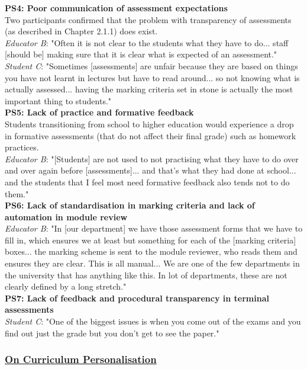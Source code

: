 \textbf{PS4: Poor communication of assessment expectations}\\
Two participants confirmed that the problem with transparency of assessments (as described in Chapter 2.1.1) 
does exist.\\
\textit{Educator B}: "Often it is not clear to the students what they have to do... staff [should be] making sure 
that it is clear what is expected of an assessment."\\
\textit{Student C}: "Sometimes [assessments] are unfair because they are based on things you have 
not learnt in lectures but have to read around... so not knowing what is actually assessed... having the 
marking criteria set in stone is actually the most important thing to students."
\vspace{0.25cm}\\
\textbf{PS5: Lack of practice and formative feedback}\\
Students transitioning from school to higher education would experience a drop in formative assessments
(that do not affect their final grade) such as homework practices.\\
\textit{Educator B}: "[Students] are not used to not practising what they have to do over and over again before
[assessments]... and that's what they had done at school... and the students that I feel most need 
formative feedback also tends not to do them."
\vspace{0.25cm}\\
\textbf{PS6: Lack of standardisation in marking criteria and lack of automation in module review}\\
\textit{Educator B}: "In [our department] we have those assessment forms that we have to fill in, which ensures 
we at least but something for each of the [marking criteria] boxes... the marking scheme is sent to the module 
reviewer, who reads them and ensures they are clear. This is all manual... We are one of the few departments 
in the university that has anything like this. In lot of departments, these are not clearly defined 
by a long stretch."
\vspace{0.25cm}\\
\textbf{PS7: Lack of feedback and procedural transparency in terminal assessments}\\
\textit{Student C}: "One of the biggest issues is when you come out of the exams and you find out 
just the grade but you don't get to see the paper."

\subsubsection{\underline{On Curriculum Personalisation}}

